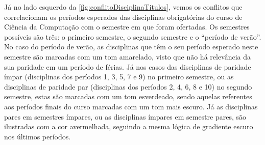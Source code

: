 Já no lado esquerdo da \autoref{fig:conflitoDisciplinaTitulos}, vemos os conflitos que correlacionam os períodos esperados das disciplinas obrigatórias do curso de Ciência da Computação com o semestre em que foram ofertadas. Os semestres possíveis são três: o primeiro semestre, o segundo semestre e o ``período de verão''. No caso do período de verão, as disciplinas que têm o seu período esperado neste semestre são marcadas com um tom amarelado, visto que não há relevância da sua paridade em um período de férias. Já nos casos das disciplinas de paridade ímpar (disciplinas dos períodos 1, 3, 5, 7 e 9) no primeiro semestre, ou as disciplinas de paridade par (disciplinas dos períodos 2, 4, 6, 8 e 10) no segundo semestre, estas são marcadas com um tom esverdeado, sendo aquelas referentes aos períodos finais do curso marcadas com um tom mais escuro. Já as disciplinas pares em semestres ímpares, ou as disciplinas ímpares em semestre pares, são ilustradas com a cor avermelhada, seguindo a mesma lógica de gradiente escuro nos últimos períodos.
